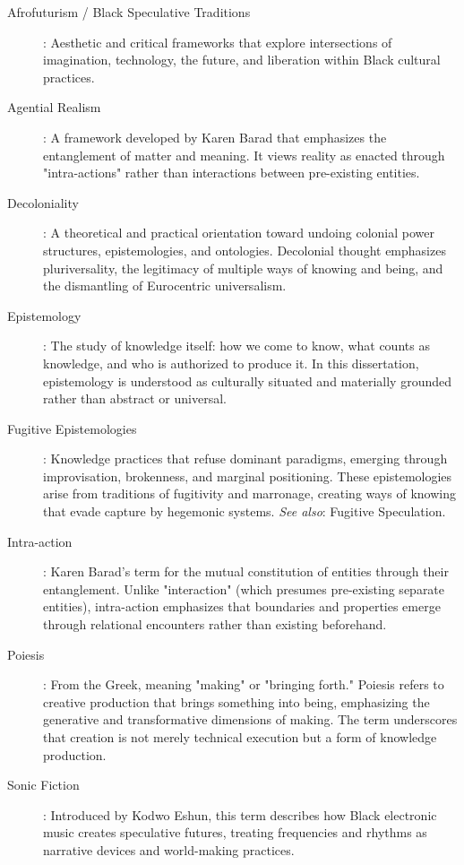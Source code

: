 \begin{description}
	\item[Afrofuturism / Black Speculative Traditions]: Aesthetic and critical frameworks that explore intersections of imagination, technology, the future, and liberation within Black cultural practices.
	
	\item[Agential Realism]: A framework developed by Karen Barad that emphasizes the entanglement of matter and meaning. It views reality as enacted through "intra-actions" rather than interactions between pre-existing entities.
	
	\item[Decoloniality]: A theoretical and practical orientation toward undoing colonial power structures, epistemologies, and ontologies. Decolonial thought emphasizes pluriversality, the legitimacy of multiple ways of knowing and being, and the dismantling of Eurocentric universalism.
	
	\item[Epistemology]: The study of knowledge itself: how we come to know, what counts as knowledge, and who is authorized to produce it. In this dissertation, epistemology is understood as culturally situated and materially grounded rather than abstract or universal.
	
	\item[Fugitive Epistemologies]: Knowledge practices that refuse dominant paradigms, emerging through improvisation, brokenness, and marginal positioning. These epistemologies arise from traditions of fugitivity and marronage, creating ways of knowing that evade capture by hegemonic systems. \textit{See also}: Fugitive Speculation.
	
	\item[Intra-action]: Karen Barad's term for the mutual constitution of entities through their entanglement. Unlike "interaction" (which presumes pre-existing separate entities), intra-action emphasizes that boundaries and properties emerge through relational encounters rather than existing beforehand.
	
	\item[Poiesis]: From the Greek, meaning "making" or "bringing forth." Poiesis refers to creative production that brings something into being, emphasizing the generative and transformative dimensions of making. The term underscores that creation is not merely technical execution but a form of knowledge production.
	
	\item[Sonic Fiction]: Introduced by Kodwo Eshun, this term describes how Black electronic music creates speculative futures, treating frequencies and rhythms as narrative devices and world-making practices.
	

\end{description}
